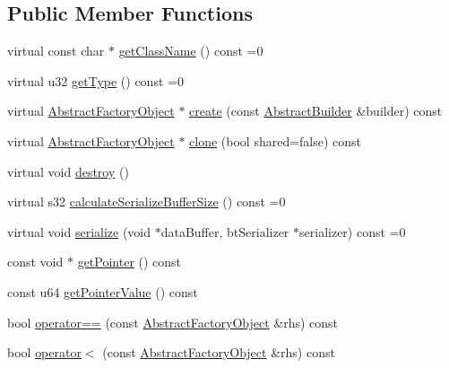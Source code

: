 \subsection*{Public Member Functions}
\begin{DoxyCompactItemize}
\item 
virtual const char $\ast$ \hyperlink{classjli_1_1_abstract_factory_object_a182551cb7d56406b4d3882fbff89a8df}{get\+Class\+Name} () const =0
\item 
virtual u32 \hyperlink{classjli_1_1_abstract_factory_object_a7fa50dd83680e6ef5e6d3f964490a3ca}{get\+Type} () const =0
\item 
virtual \hyperlink{classjli_1_1_abstract_factory_object}{Abstract\+Factory\+Object} $\ast$ \hyperlink{classjli_1_1_abstract_factory_object_af2f25dcc27827022294a2078ef35b9d3}{create} (const \hyperlink{classjli_1_1_abstract_builder}{Abstract\+Builder} \&builder) const 
\item 
virtual \hyperlink{classjli_1_1_abstract_factory_object}{Abstract\+Factory\+Object} $\ast$ \hyperlink{classjli_1_1_abstract_factory_object_a1884315c8cd248335161e6f52a3519de}{clone} (bool shared=false) const 
\item 
virtual void \hyperlink{classjli_1_1_abstract_factory_object_a40ffbc527e0d7e3d5a6adf241a63ac25}{destroy} ()
\item 
virtual s32 \hyperlink{classjli_1_1_abstract_factory_object_a37d06a25aaf9400a2f5b0a7ee110b236}{calculate\+Serialize\+Buffer\+Size} () const =0
\item 
virtual void \hyperlink{classjli_1_1_abstract_factory_object_a9971edc5976c06cbfae1b0ae80722a43}{serialize} (void $\ast$data\+Buffer, bt\+Serializer $\ast$serializer) const =0
\item 
const void $\ast$ \hyperlink{classjli_1_1_abstract_factory_object_aa32d6469cb7cc3dab360993a7e1a276e}{get\+Pointer} () const 
\item 
const u64 \hyperlink{classjli_1_1_abstract_factory_object_ab96c5857b75e6446fa38e056fefd7052}{get\+Pointer\+Value} () const 
\item 
bool \hyperlink{classjli_1_1_abstract_factory_object_a0dffe2fef49472131fdc99a04a16aa00}{operator==} (const \hyperlink{classjli_1_1_abstract_factory_object}{Abstract\+Factory\+Object} \&rhs) const 
\item 
bool \hyperlink{classjli_1_1_abstract_factory_object_aba24919cc7fa9fee04ed0b6bbeaee0e9}{operator$<$} (const \hyperlink{classjli_1_1_abstract_factory_object}{Abstract\+Factory\+Object} \&rhs) const 
\item 

\end{DoxyCompactItemize}
